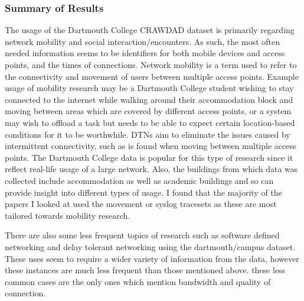 \subsubsection{Summary of Results}
The usage of the Dartmouth College CRAWDAD dataset is primarily regarding network mobility and social interaction/encounters. As such, the most often needed information seems to be identifiers for both mobile devices and access points, and the times of connections. Network mobility is a term used to refer to the connectivity and movement of users between multiple access points. Example usage of mobility research may be a Dartmouth College student wishing to stay connected to the internet while walking around their accommodation block and moving between areas which are covered by different access points, or a system may wish to offload a task but needs to be able to expect certain location-based conditions for it to be worthwhile. DTNs aim to eliminate the issues caused by intermittent connectivity, such as is found when moving between multiple access points. The Dartmouth College data is popular for this type of research since it reflect real-life usage of a large network. Also, the buildings from which data was collected include accommodation as well as academic buildings and so can provide insight into different types of usage.
I found that the majority of the papers I looked at used the movement \cite{dartmouthcampus2009movement} or syslog \cite{dartmouthcampus2009syslog} tracesets as these are most tailored towards mobility research. 

There are also some less frequent topics of research such as software defined networking and delay tolerant networking using the dartmouth/campus dataset. These uses seem to require a wider variety of information from the data, however these instances are much less frequent than those mentioned above. these less common cases are the only ones which mention bandwidth and quality of connection.

